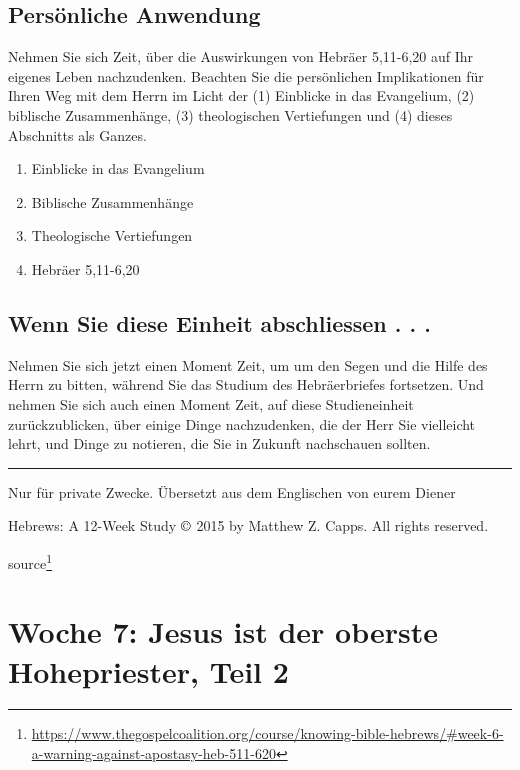 \documentclass[
  12pt,
]{krantz}
\providecommand{\tightlist}{%
  \setlength{\itemsep}{0pt}\setlength{\parskip}{0pt}}
\renewcommand{\href}[2]{#2\footnote{\url{#1}}}
\begin{document}
\hypertarget{persuxf6nliche-anwendung}{%
\section{Persönliche Anwendung}\label{persuxf6nliche-anwendung}}

Nehmen Sie sich Zeit, über die Auswirkungen von Hebräer 5,11-6,20 auf Ihr eigenes Leben nachzudenken. Beachten Sie die persönlichen Implikationen für Ihren Weg mit dem Herrn im Licht der (1) Einblicke in das Evangelium, (2) biblische Zusammenhänge, (3) theologischen Vertiefungen und (4) dieses Abschnitts als Ganzes.

\begin{enumerate}
\def\labelenumi{\arabic{enumi}.}
\tightlist
\item
  Einblicke in das Evangelium
\item
  Biblische Zusammenhänge
\item
  Theologische Vertiefungen
\item
  Hebräer 5,11-6,20
\end{enumerate}

\hypertarget{wenn-sie-diese-einheit-abschliessen-.-.-.}{%
\section{Wenn Sie diese Einheit abschliessen . . .}\label{wenn-sie-diese-einheit-abschliessen-.-.-.}}

Nehmen Sie sich jetzt einen Moment Zeit, um um den Segen und die Hilfe des Herrn zu bitten, während Sie das Studium des Hebräerbriefes fortsetzen. Und nehmen Sie sich auch einen Moment Zeit, auf diese Studieneinheit zurückzublicken, über einige Dinge nachzudenken, die der Herr Sie vielleicht lehrt, und Dinge zu notieren, die Sie in Zukunft nachschauen sollten.

\begin{center}\rule{0.5\linewidth}{0.5pt}\end{center}

Nur für private Zwecke. Übersetzt aus dem Englischen von eurem Diener

Hebrews: A 12-Week Study \(\copyright\) 2015 by Matthew Z. Capps. All rights reserved.

\href{https://www.thegospelcoalition.org/course/knowing-bible-hebrews/\#week-6-a-warning-against-apostasy-heb-511-620}{source}

\hypertarget{woche07}{%
\chapter{Woche 7: Jesus ist der oberste Hohepriester, Teil 2}\label{woche07}}
\end{document}
